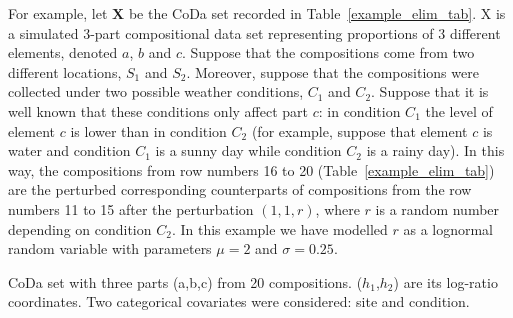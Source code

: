 \documentclass[12pt, a4paper]{article}
\theoremstyle{definition}
\begin{document}
For example, let $\mathbf{X}$ be the CoDa set recorded in Table~\ref{example_elim_tab}. X is a simulated $3$-part compositional data set representing proportions of $3$ different elements, denoted $a$, $b$ and $c$. Suppose that the  compositions come from two different locations, $S_1$ and $S_2$. Moreover, suppose that the compositions were collected under two possible weather conditions, $C_1$ and $C_2$. Suppose that it is well known
that these conditions only affect part $c$: in condition $C_1$ the level of element $c$ is lower than in condition $C_2$ (for example, suppose that element $c$ is water and condition $C_1$ is a sunny day while condition $C_2$ is a rainy day). In this way, the compositions from row numbers 16 to 20 (Table~\ref{example_elim_tab}) are the perturbed corresponding counterparts of compositions from the
row numbers 11 to 15 after the perturbation $(1,1,r)$, where $r$ is a random number depending on condition $C_2$. In this example we have modelled $r$ as a lognormal random variable with parameters $\mu=2$ and $\sigma=0.25$. 
\begin{table}[htpb]
\centering
\scriptsize

\caption{CoDa set with three parts (a,b,c) from 20 compositions. ($h_1$,$h_2$) are its log-ratio coordinates.
Two categorical covariates were considered: site and condition. }
\label{example_elim_tab}
\end{table}
\end{document}
